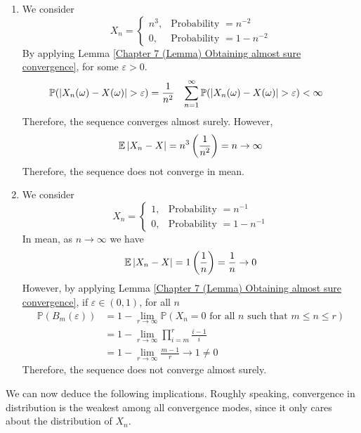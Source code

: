 \documentclass{huhtakm-template-book}
\newcommand{\prob}{\mathbb{P}}
\newcommand{\expect}{\mathbb{E}}
\begin{document}
\begin{proofing}
	\begin{enumerate}
		\item We consider
		\begin{equation*}
			X_{n}=\begin{cases}
				n^{3}, &\text{Probability }=n^{-2}\\
				0, &\text{Probability }=1-n^{-2}
			\end{cases}
		\end{equation*}
		By applying Lemma \ref{Chapter 7 (Lemma) Obtaining almost sure convergence}, for some $\varepsilon>0$.
		\begin{align*}
			\prob(\abs{X_{n}(\omega)-X(\omega)}>\varepsilon)&=\frac{1}{n^{2}} & \sum_{n=1}^{\infty}\prob(\abs{X_{n}(\omega)-X(\omega)}>\varepsilon)&<\infty
		\end{align*}
		Therefore, the sequence converges almost surely. However,
		\begin{equation*}
			\expect\abs{X_{n}-X}=n^{3}\left(\frac{1}{n^{2}}\right)=n\to\infty
		\end{equation*}
		Therefore, the sequence does not converge in mean.
		\item We consider
		\begin{equation*}
			X_{n}=\begin{cases}
				1, &\text{Probability }=n^{-1}\\
				0, &\text{Probability }=1-n^{-1}
			\end{cases}
		\end{equation*}
		In mean, as $n\to\infty$ we have
		\begin{equation*}
			\expect\abs{X_{n}-X}=1\left(\frac{1}{n}\right)=\frac{1}{n}\to 0
		\end{equation*}
		However, by applying Lemma \ref{Chapter 7 (Lemma) Obtaining almost sure convergence}, if $\varepsilon\in(0,1)$, for all $n$
		\begin{align*}
			\prob(B_{m}(\varepsilon))&=1-\lim_{r\to\infty}\prob(X_{n}=0\text{ for all }n\text{ such that }m\leq n\leq r)\\
			&=1-\lim_{r\to\infty}\prod_{i=m}^{r}\frac{i-1}{i}\\
			&=1-\lim_{r\to\infty}\frac{m-1}{r}\to 1\neq 0
		\end{align*}
		Therefore, the sequence does not converge almost surely.
	\end{enumerate}
\end{proofing}
We can now deduce the following implications. Roughly speaking, convergence in distribution is the weakest among all convergence modes, since it only cares about the distribution of $X_{n}$.
\end{document}

